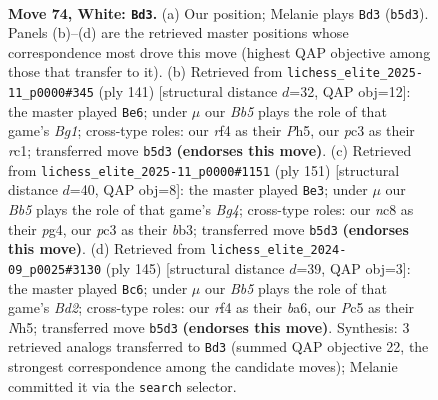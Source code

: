 \documentclass[11pt]{article}
\begin{document}
\clearpage

\begin{figure}[p]\centering
\begin{subfigure}{0.46\textwidth}\centering
\resizebox{\linewidth}{!}{%
\newchessgame
\chessboard[
  setfen={1Rnk4/8/P7/1BP4p/5r2/2p4P/2P1K1P1/8 w - - 0 74},
  showmover=false,
  pgfstyle=straightmove, color=movearrow, markmove={b5-d3}
]}
\caption{}
\end{subfigure}\hfill
\begin{subfigure}{0.46\textwidth}\centering
\resizebox{\linewidth}{!}{%
\newchessgame
\chessboard[
  setfen={1r4b1/3P4/1N1k2p1/7p/3K3P/6P1/p7/2R5 b - - 19 71},
  showmover=false,
  pgfstyle=straightmove, color=movearrow, markmove={g8-e6}
]}
\caption{}
\end{subfigure}
\\[4pt]
\begin{subfigure}{0.46\textwidth}\centering
\resizebox{\linewidth}{!}{%
\newchessgame
\chessboard[
  setfen={8/8/5p1p/1P2pPb1/R5P1/1B1k2r1/8/5K2 b - - 2 76},
  showmover=false,
  pgfstyle=straightmove, color=movearrow, markmove={g5-e3}
]}
\caption{}
\end{subfigure}\hfill
\begin{subfigure}{0.46\textwidth}\centering
\resizebox{\linewidth}{!}{%
\newchessgame
\chessboard[
  setfen={8/3b4/BP1k4/3N1ppn/p2K4/7P/8/8 b - - 0 73},
  showmover=false,
  pgfstyle=straightmove, color=movearrow, markmove={d7-c6}
]}
\caption{}
\end{subfigure}
\caption{\textbf{Move 74, White: \texttt{Bd3}.} (a) Our position; Melanie plays \texttt{Bd3} (\texttt{b5d3}). Panels (b)--(d) are the retrieved master positions whose correspondence most drove this move (highest QAP objective among those that transfer to it). (b) Retrieved from \texttt{lichess\_elite\_2025-11\_p0000\#345} (ply 141) [structural distance $d$=32, QAP obj=12]: the master played \texttt{Be6}; under $\mu$ our \emph{Bb5} plays the role of that game's \emph{Bg1}; cross-type roles: our \emph{r}f4 as their \emph{P}h5, our \emph{p}c3 as their \emph{r}c1; transferred move \texttt{b5d3} \textbf{(endorses this move)}. (c) Retrieved from \texttt{lichess\_elite\_2025-11\_p0000\#1151} (ply 151) [structural distance $d$=40, QAP obj=8]: the master played \texttt{Be3}; under $\mu$ our \emph{Bb5} plays the role of that game's \emph{Bg4}; cross-type roles: our \emph{n}c8 as their \emph{p}g4, our \emph{p}c3 as their \emph{b}b3; transferred move \texttt{b5d3} \textbf{(endorses this move)}. (d) Retrieved from \texttt{lichess\_elite\_2024-09\_p0025\#3130} (ply 145) [structural distance $d$=39, QAP obj=3]: the master played \texttt{Bc6}; under $\mu$ our \emph{Bb5} plays the role of that game's \emph{Bd2}; cross-type roles: our \emph{r}f4 as their \emph{b}a6, our \emph{P}c5 as their \emph{N}h5; transferred move \texttt{b5d3} \textbf{(endorses this move)}. Synthesis: 3 retrieved analogs transferred to \texttt{Bd3} (summed QAP objective 22, the strongest correspondence among the candidate moves); Melanie committed it via the \texttt{search} selector.}
\label{fig:thought-m146}
\end{figure}
\end{document}
